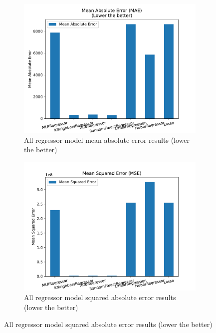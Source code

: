 \begin{figure}[!htbp]
    \centering
    \begin{subfigure}[b]{0.49\textwidth}
        \includegraphics[width=\textwidth]{../regression_model/plots/Comparison/Mean_Absolute_Error.pdf}
        \caption{All regressor model mean absolute error results (lower the better)}
        \label{Fig: all_MAE}
    \end{subfigure}
    \hfill
    \begin{subfigure}[b]{0.49\textwidth}
        \includegraphics[width=\textwidth]{../regression_model/plots/Comparison/Mean_Squared_Error.pdf}
        \caption{All regressor model squared absolute error results (lower the better)}
        \label{Fig: all_MSAE}

\end{subfigure}
\end{figure}
